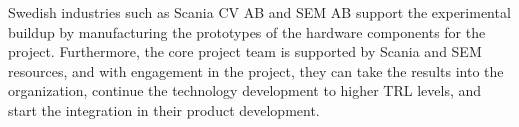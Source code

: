 \documentclass{article}
\begin{document}
Swedish industries such as Scania CV AB and SEM AB support the experimental buildup by manufacturing the prototypes of the hardware components for the project. Furthermore, the core project team is supported by Scania and SEM resources, and with engagement in the project, they can take the results into the organization, continue the technology development to higher TRL levels, and start the integration in their product development.

\nocite{the_icct_why_2021}
\nocite{sveriges_miljomal_utslapp_nodate}
\nocite{fossilfrittsverige}




\end{document}
